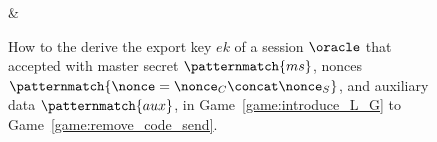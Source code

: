 \begin{figure}
\begin{leftfullpage}
\begin{adjustbox}{tabular={cc},Trim=0.9ex 0 0 0, width=\textwidth}
\begin{adjustbox}{minipage=[t][]{\codewidth},fbox}
\begin{algorithmic}[1]
		\end{algorithmic}
	\end{adjustbox}
	
	&
	
\end{adjustbox}


\caption{How to the derive the export key $ek$ of a session $\oracle$ that accepted with master secret $\patternmatch{ms}$, 
nonces $\patternmatch{\nonce = \nonce_{C} \concat  \nonce_{S}}$, and auxiliary data $\patternmatch{aux}$,
in Game~\ref{game:introduce_L_G} to Game~\ref{game:remove_code_send}.
}
\label{fig:code_for_game_hops_Send}

	\end{leftfullpage}

\end{figure}
